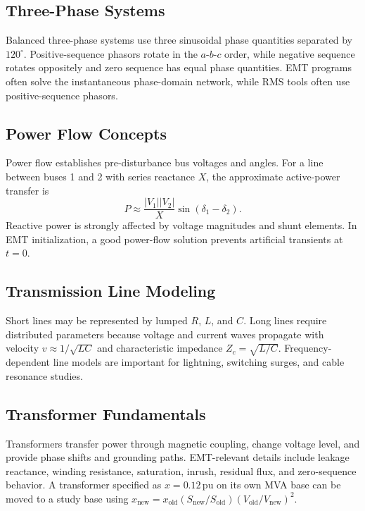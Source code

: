 \documentclass[11pt]{article}
\newcommand{\pu}{\mathrm{pu}}
\begin{document}
\subsection{Three-Phase Systems}
Balanced three-phase systems use three sinusoidal phase quantities separated by $120^\circ$. Positive-sequence phasors rotate in the $a$-$b$-$c$ order, while negative sequence rotates oppositely and zero sequence has equal phase quantities. EMT programs often solve the instantaneous phase-domain network, while RMS tools often use positive-sequence phasors.

\subsection{Power Flow Concepts}
Power flow establishes pre-disturbance bus voltages and angles. For a line between buses 1 and 2 with series reactance $X$, the approximate active-power transfer is
\begin{equation}
P \approx \frac{|V_1||V_2|}{X}\sin(\delta_1-\delta_2).
\end{equation}
Reactive power is strongly affected by voltage magnitudes and shunt elements. In EMT initialization, a good power-flow solution prevents artificial transients at $t=0$.

\subsection{Transmission Line Modeling}
Short lines may be represented by lumped $R$, $L$, and $C$. Long lines require distributed parameters because voltage and current waves propagate with velocity $v\approx 1/\sqrt{LC}$ and characteristic impedance $Z_c=\sqrt{L/C}$. Frequency-dependent line models are important for lightning, switching surges, and cable resonance studies.

\subsection{Transformer Fundamentals}
Transformers transfer power through magnetic coupling, change voltage level, and provide phase shifts and grounding paths. EMT-relevant details include leakage reactance, winding resistance, saturation, inrush, residual flux, and zero-sequence behavior. A transformer specified as $x=0.12\,\pu$ on its own MVA base can be moved to a study base using $x_{\mathrm{new}}=x_{\mathrm{old}}(S_{\mathrm{new}}/S_{\mathrm{old}})(V_{\mathrm{old}}/V_{\mathrm{new}})^2$.
\end{document}
